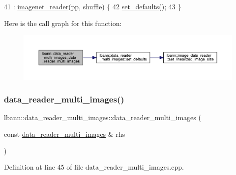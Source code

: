 \begin{DoxyCode}
41   : \hyperlink{classlbann_1_1imagenet__reader_a642331b94cdc3caad8335d65d096141c}{imagenet\_reader}(pp, shuffle) \{
42   \hyperlink{classlbann_1_1data__reader__multi__images_a5abe6981d750bc145e50f6141772805c}{set\_defaults}();
43 \}
\end{DoxyCode}
Here is the call graph for this function\+:\nopagebreak
\begin{figure}[H]
\begin{center}
\leavevmode
\includegraphics[width=350pt]{classlbann_1_1data__reader__multi__images_a2aa9155e574084985bf3b1bd3663d1c5_cgraph}
\end{center}
\end{figure}
\mbox{\label{classlbann_1_1data__reader__multi__images_abc055112884c444886fe8f7eabe58f05}} 
\subsubsection{\texorpdfstring{data\+\_\+reader\+\_\+multi\+\_\+images()}{data\_reader\_multi\_images()}\hspace{0.1cm}{\footnotesize\ttfamily [3/3]}}
{\footnotesize\ttfamily lbann\+::data\+\_\+reader\+\_\+multi\+\_\+images\+::data\+\_\+reader\+\_\+multi\+\_\+images (\begin{DoxyParamCaption}\item[{const \hyperlink{classlbann_1_1data__reader__multi__images}{data\+\_\+reader\+\_\+multi\+\_\+images} \&}]{rhs }\end{DoxyParamCaption})}



Definition at line 45 of file data\+\_\+reader\+\_\+multi\+\_\+images.\+cpp.


